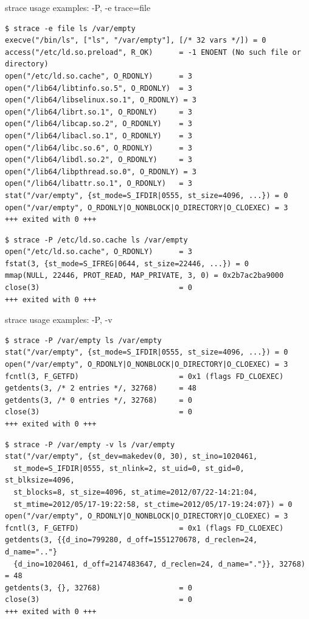 \documentclass[unicode]{beamer}
\begin{document}
\begin{frame}[fragile]{strace usage examples: -P, -e trace=file}
\scriptsize
\begin{verbatim}
$ strace -e file ls /var/empty
execve("/bin/ls", ["ls", "/var/empty"], [/* 32 vars */]) = 0
access("/etc/ld.so.preload", R_OK)      = -1 ENOENT (No such file or directory)
open("/etc/ld.so.cache", O_RDONLY)      = 3
open("/lib64/libtinfo.so.5", O_RDONLY)  = 3
open("/lib64/libselinux.so.1", O_RDONLY) = 3
open("/lib64/librt.so.1", O_RDONLY)     = 3
open("/lib64/libcap.so.2", O_RDONLY)    = 3
open("/lib64/libacl.so.1", O_RDONLY)    = 3
open("/lib64/libc.so.6", O_RDONLY)      = 3
open("/lib64/libdl.so.2", O_RDONLY)     = 3
open("/lib64/libpthread.so.0", O_RDONLY) = 3
open("/lib64/libattr.so.1", O_RDONLY)   = 3
stat("/var/empty", {st_mode=S_IFDIR|0555, st_size=4096, ...}) = 0
open("/var/empty", O_RDONLY|O_NONBLOCK|O_DIRECTORY|O_CLOEXEC) = 3
+++ exited with 0 +++
\end{verbatim}

\begin{verbatim}
$ strace -P /etc/ld.so.cache ls /var/empty
open("/etc/ld.so.cache", O_RDONLY)      = 3
fstat(3, {st_mode=S_IFREG|0644, st_size=22446, ...}) = 0
mmap(NULL, 22446, PROT_READ, MAP_PRIVATE, 3, 0) = 0x2b7ac2ba9000
close(3)                                = 0
+++ exited with 0 +++
\end{verbatim}
\end{frame}

\begin{frame}[fragile]{strace usage examples: -P, -v}
\scriptsize
\begin{verbatim}
$ strace -P /var/empty ls /var/empty
stat("/var/empty", {st_mode=S_IFDIR|0555, st_size=4096, ...}) = 0
open("/var/empty", O_RDONLY|O_NONBLOCK|O_DIRECTORY|O_CLOEXEC) = 3
fcntl(3, F_GETFD)                       = 0x1 (flags FD_CLOEXEC)
getdents(3, /* 2 entries */, 32768)     = 48
getdents(3, /* 0 entries */, 32768)     = 0
close(3)                                = 0
+++ exited with 0 +++
\end{verbatim}

\begin{verbatim}
$ strace -P /var/empty -v ls /var/empty
stat("/var/empty", {st_dev=makedev(0, 30), st_ino=1020461,
  st_mode=S_IFDIR|0555, st_nlink=2, st_uid=0, st_gid=0, st_blksize=4096,
  st_blocks=8, st_size=4096, st_atime=2012/07/22-14:21:04,
  st_mtime=2012/05/17-19:22:58, st_ctime=2012/05/17-19:24:07}) = 0
open("/var/empty", O_RDONLY|O_NONBLOCK|O_DIRECTORY|O_CLOEXEC) = 3
fcntl(3, F_GETFD)                       = 0x1 (flags FD_CLOEXEC)
getdents(3, {{d_ino=799280, d_off=1551270678, d_reclen=24, d_name=".."}
  {d_ino=1020461, d_off=2147483647, d_reclen=24, d_name="."}}, 32768) = 48
getdents(3, {}, 32768)                  = 0
close(3)                                = 0
+++ exited with 0 +++
\end{verbatim}
\end{frame}
\end{document}
